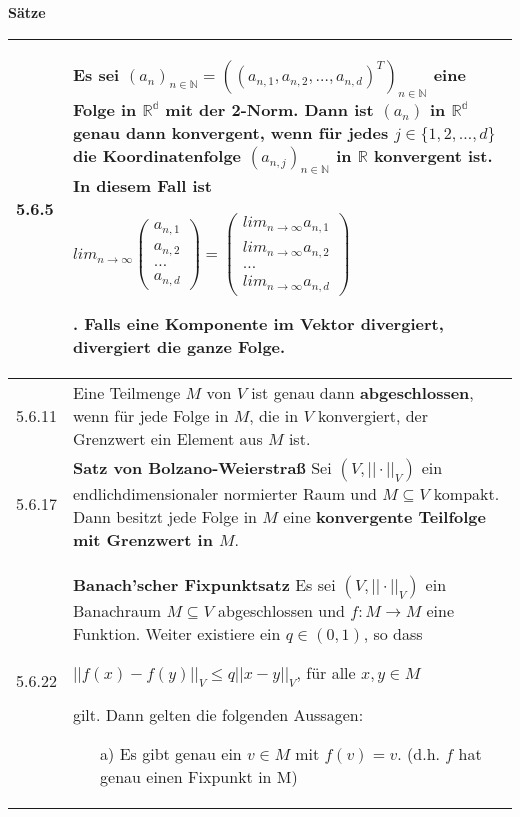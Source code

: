 \noindent 
\textbf{Sätze}
\begin{table}[H]
\begin{tabularx}{\textwidth}{X m{16cm}}
    \toprule

    5.6.5 & Es sei $(a_n)_{n \in \mathbb{N}} = ((a_{n,1}, a_{n,2}, \dots, a_{n,d})^T)_{n \in \mathbb{N}}$ eine Folge in $\mathbb{R^d}$
            mit der 2-Norm. Dann ist $(a_n)$ in $\mathbb{R^d}$ genau dann \textbf{konvergent}, wenn für jedes $j \in \{1,2,\dots,d\}$ die
            Koordinatenfolge $(a_{n,j})_{n \in \mathbb{N}}$ in $\mathbb{R}$ \textbf{konvergent} ist. In diesem Fall ist \hfill \break
            \centerline{$lim_{n \rightarrow \infty}\begin{pmatrix}a_{n,1}\\a_{n,2}\\\dots \\ a_{n,d}\end{pmatrix} =
                \begin{pmatrix} lim_{n \rightarrow \infty} a_{n,1} \\ lim_{n \rightarrow \infty} a_{n,2} \\ \dots \\
                lim_{n \rightarrow \infty} a_{n,d} \end{pmatrix}$}.
            Falls eine Komponente im Vektor divergiert, divergiert die ganze Folge. \\
    \midrule
    5.6.11& Eine Teilmenge $M$ von $V$ ist genau dann \textbf{abgeschlossen}, wenn für jede Folge in $M$, die in $V$ konvergiert,
            der Grenzwert ein Element aus $M$ ist. \\
    \midrule
    5.6.17& \textbf{Satz von Bolzano-Weierstra\ss} \hfill \break
            Sei $(V, ||\cdot||_V)$ ein endlichdimensionaler normierter Raum und $M \subseteq V$ kompakt. Dann besitzt jede Folge in $M$
            eine \textbf{konvergente Teilfolge mit Grenzwert in $M$}. \\
    \midrule
    5.6.22& \textbf{Banach'scher Fixpunktsatz} \hfill \break
            Es sei $(V, ||\cdot||_V)$ ein Banachraum $M \subseteq V$ abgeschlossen und $f: M \rightarrow M$ eine Funktion.
            Weiter existiere ein $q \in (0,1)$, so dass \hfill \break
            \centerline{$||f(x) - f(y)||_V \leq q ||x-y||_V$, für alle $x,y \in M$}
            gilt. Dann gelten die folgenden Aussagen:
            \begin{itemize}[topsep=-0.5cm]
                \item[a)] Es gibt genau ein $v \in M$ mit $f(v) = v$. (d.h. $f$ hat genau einen Fixpunkt in M)

\end{itemize}
\end{tabularx}
\end{table}
